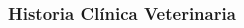 \documentclass[14pt]{beamer}
\begin{document}
\begin{frame}
\frametitle{Historia Clínica Veterinaria}

\begin{columns}
\begin{column}{0.5\textwidth}
\begin{center}


\end{center}
\end{column}
\begin{column}{0.5\textwidth}
\begin{center}


\end{center}
\end{column}
\end{columns}
\end{frame}
\end{document}
